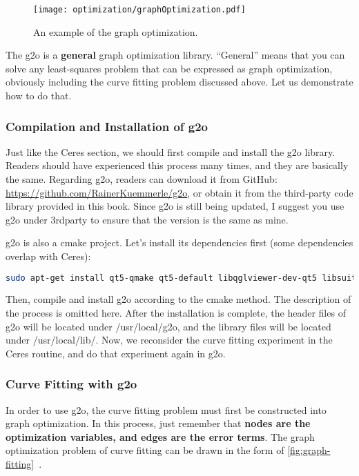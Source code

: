 \begin{figure}[!ht]
    \centering
    \texttt{[image: optimization/graphOptimization.pdf]}
    \caption{An example of the graph optimization.}
    \label{fig:graph-optimization}
\end{figure}

The g2o is a \textbf{general} graph optimization library. ``General'' means that you can solve any least-squares problem that can be expressed as graph optimization, obviously including the curve fitting problem discussed above. Let us demonstrate how to do that.

\subsubsection{Compilation and Installation of g2o}
Just like the Ceres section, we should first compile and install the g2o library. Readers should have experienced this process many times, and they are basically the same. Regarding g2o, readers can download it from GitHub: \url{https://github.com/RainerKuemmerle/g2o}, or obtain it from the third-party code library provided in this book. Since g2o is still being updated, I suggest you use g2o under 3rdparty to ensure that the version is the same as mine.

g2o is also a cmake project. Let's install its dependencies first (some dependencies overlap with Ceres):
\begin{lstlisting}[language=sh,caption=terminal input:]
    sudo apt-get install qt5-qmake qt5-default libqglviewer-dev-qt5 libsuitesparse-dev libcxsparse3 libcholmod3
\end{lstlisting}

Then, compile and install g2o according to the cmake method. The description of the process is omitted here. After the installation is complete, the header files of g2o will be located under /usr/local/g2o, and the library files will be located under /usr/local/lib/. Now, we reconsider the curve fitting experiment in the Ceres routine, and do that experiment again in g2o.

\subsubsection{Curve Fitting with g2o}
In order to use g2o, the curve fitting problem must first be constructed into graph optimization. In this process, just remember that \textbf{nodes are the optimization variables, and edges are the error terms}. The graph optimization problem of curve fitting can be drawn in the form of \autoref{fig:graph-fitting}~.

